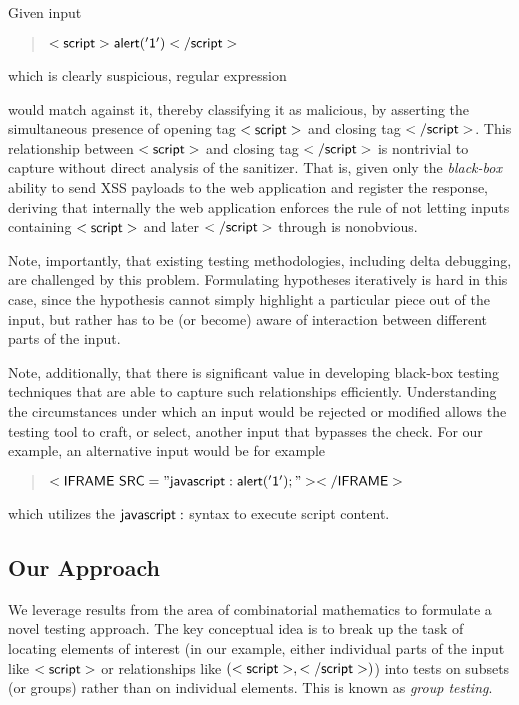 Given input 
\begin{quote}
$\sf{<script>alert('1')</script>}$
\end{quote}
which is clearly suspicious, regular expression
\begin{quote}
\end{quote}
would match against it, thereby classifying it as malicious, by asserting the simultaneous presence of opening tag ${\sf <script>}$ and closing tag ${\sf </script>}$. This relationship between ${\sf <script>}$ and closing tag ${\sf </script>}$ is nontrivial to capture without direct analysis of the sanitizer. That is, given only the \emph{black-box} ability to send XSS payloads to the web application and register the response, deriving that internally the web application enforces the rule of not letting inputs containing ${\sf <script>}$ and later ${\sf </script>}$ through is nonobvious.

Note, importantly, that existing testing methodologies, including delta debugging, are challenged by this problem. Formulating hypotheses iteratively is hard in this case, since the hypothesis cannot simply highlight a particular piece out of the input, but rather has to be (or become) aware of interaction between different parts of the input.

Note, additionally, that there is significant value in developing black-box testing techniques that are able to capture such relationships efficiently. Understanding the circumstances under which an input would be rejected or modified allows the testing tool to craft, or select, another input that bypasses the check. For our example, an alternative input would be for example
\begin{quote}
	${\sf <IFRAME~SRC="javascript:alert('1');"></IFRAME>}$
\end{quote}
which utilizes the ${\sf javascript:}$ syntax to execute script content.

\subsection{Our Approach} We leverage results from the area of combinatorial mathematics to formulate a novel testing approach. The key conceptual idea is to break up the task of locating elements of interest (in our example, either individual parts of the input like ${\sf <script>}$ or relationships like ${\sf (<script>, </script>)}$) into tests on subsets (or groups) rather than on individual elements. This is known as \emph{group testing}.

